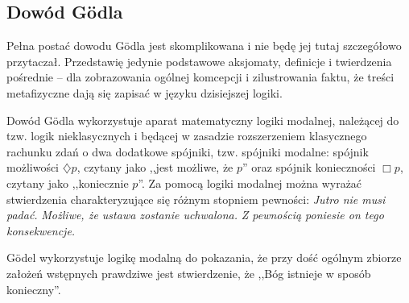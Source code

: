 \documentclass[12pt]{article}
\begin{document}
\begin{multicols}{2}
\section{Dowód G\"odla}
Pełna postać dowodu G\"odla jest skomplikowana i nie będę jej tutaj szczegółowo przytaczał. Przedstawię jedynie podstawowe aksjomaty, definicje i twierdzenia pośrednie -- dla zobrazowania ogólnej komcepcji i zilustrowania faktu, że treści metafizyczne dają się zapisać w języku dzisiejszej logiki. 

Dowód G\"odla wykorzystuje aparat matematyczny logiki modalnej, należącej do tzw. logik nieklasycznych i będącej w zasadzie rozszerzeniem klasycznego rachunku zdań o dwa dodatkowe spójniki, tzw. spójniki modalne: spójnik możliwości $\diamondsuit p$, czytany jako ,,jest możliwe, że $p$'' oraz spójnik konieczności $\Box p$, czytany jako ,,koniecznie $p$''. Za pomocą logiki modalnej można wyrażać stwierdzenia charakteryzujące się różnym stopniem pewności: \emph{Jutro nie musi padać.} \emph{Możliwe, że ustawa zostanie uchwalona.} \emph{Z pewnością poniesie on tego konsekwencje. }
		
G\"odel wykorzystuje logikę modalną do pokazania, że przy dość ogólnym zbiorze założeń wstępnych prawdziwe jest stwierdzenie, że ,,Bóg istnieje w sposób konieczny''. 


\end{multicols}
\end{document}
